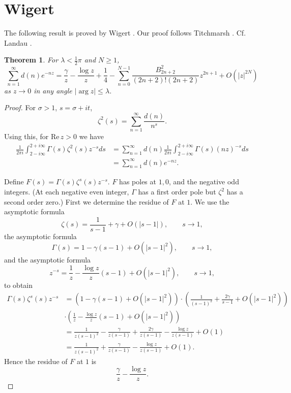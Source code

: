 \documentclass{amsart}
\def\Re{\ensuremath{\mathrm{Re}}\,}
\newtheorem{theorem}{Theorem}
\begin{document}
\section{Wigert}
The following result is proved by Wigert \cite{wigert}. Our proof follows Titchmarsh \cite[p.~163, Theorem 7.15]{zeta}. 
Cf. Landau  \cite{landau1918}.


\begin{theorem}
For $\lambda<\frac{1}{2}\pi$ and $N \geq 1$,
\[
\sum_{n=1}^\infty d(n) e^{-nz} = \frac{\gamma}{z}-\frac{\log z}{z}+\frac{1}{4}- \sum_{n=0}^{N-1} \frac{B_{2n+2}^2}{(2n+2)!(2n+2)} z^{2n+1}
+O(|z|^{2N})
\]
as $z \to 0$ in any angle $|\arg z| \leq \lambda$.
\label{wigert}
\end{theorem}
\begin{proof}
For $\sigma>1$, $s=\sigma+it$,
\[
\zeta^2(s) = \sum_{n=1}^\infty \frac{d(n)}{n^s}.
\]
Using this, for
 $\Re z>0$ we have
\begin{align}
\frac{1}{2\pi i}\int_{2-i\infty}^{2+i\infty}
\Gamma(s) \zeta^2(s) z^{-s} ds & = \sum_{n=1}^\infty d(n) \frac{1}{2\pi i} \int_{2-i\infty}^{2+i\infty}
\Gamma(s) (nz)^{-s} ds
\nonumber \\
& = \sum_{n=1}^\infty d(n) e^{-nz}.
\label{mellin}
\end{align}

Define $F(s) = \Gamma(s) \zeta^s(s) z^{-s}$. $F$ has poles at
$1,0$, and the negative odd integers. (At each negative even integer, $\Gamma$ has a first order pole but $\zeta^2$ has a second order
zero.) First we determine the residue of $F$ at $1$.
We use the asymptotic formula
\[
\zeta(s) = \frac{1}{s-1}+\gamma+O(|s-1|), \qquad s \to 1,
\]
the asymptotic formula
\[
\Gamma(s)=1-\gamma(s-1)+O(|s-1|^2), \qquad s \to 1,
\]
and  the asymptotic formula
\[
z^{-s} = \frac{1}{z}-\frac{\log z}{z} (s-1)+O(|s-1|^2), \qquad  s \to 1,
\]
to obtain
\begin{align*}
 \Gamma(s) \zeta^s(s) z^{-s} &=(1-\gamma(s-1)+O(|s-1|^2)  )
\cdot \left(\frac{1}{(s-1)^2}+\frac{2\gamma}{s-1}+O(|s-1|^2)\right)\\
&\cdot \left( \frac{1}{z}-\frac{\log z}{z} (s-1)+O(|s-1|^2) \right)\\
&=\frac{1}{z(s-1)^2}
-\frac{\gamma}{z(s-1)}+\frac{2\gamma}{z(s-1)}-\frac{\log z}{z(s-1)}+O(1)\\
&=\frac{1}{z(s-1)^2}+\frac{\gamma}{z(s-1)}-\frac{\log z}{z(s-1)}+O(1).
\end{align*}
Hence the residue of $F$ at $1$ is 
\[
\frac{\gamma}{z}-\frac{\log z}{z}.
\]


\end{proof}
\end{document}
